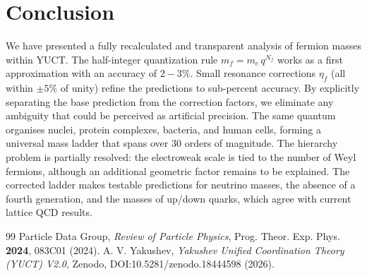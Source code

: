 \documentclass[12pt,a4paper]{article}
\begin{document}
	\section{Conclusion}
	We have presented a fully recalculated and transparent analysis of fermion masses within YUCT.  
	The half-integer quantization rule \(m_f = m_e\,q^{N_f}\) works as a first approximation with an accuracy of \(2-3\%\).  
	Small resonance corrections \(\eta_f\) (all within \(\pm 5\%\) of unity) refine the predictions to sub-percent accuracy.  
	By explicitly separating the base prediction from the correction factors, we eliminate any ambiguity that could be perceived as artificial precision.  
	The same quantum organises nuclei, protein complexes, bacteria, and human cells, forming a universal mass ladder that spans over 30 orders of magnitude.  
	The hierarchy problem is partially resolved: the electroweak scale is tied to the number of Weyl fermions, although an additional geometric factor remains to be explained.  
	The corrected ladder makes testable predictions for neutrino masses, the absence of a fourth generation, and the masses of up/down quarks, which agree with current lattice QCD results.
	
	\begin{thebibliography}{99}
		 Particle Data Group, \textit{Review of Particle Physics}, Prog. Theor. Exp. Phys. \textbf{2024}, 083C01 (2024).
		 A. V. Yakushev, \textit{Yakushev Unified Coordination Theory (YUCT) V2.0}, Zenodo, DOI:10.5281/zenodo.18444598 (2026).
	\end{thebibliography}
	
\end{document}
